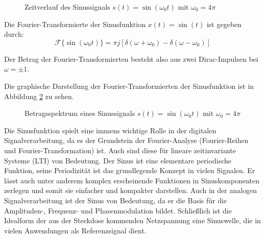 \begin{figure}[H]
\centering
{}
\caption{Zeitverlauf des Sinussignals $s(t) = \sin(\omega_0 t)$ mit $\omega_0 = 4\pi$}
\label{fig:sinus}
\end{figure}



Die Fourier-Transformierte der Sinusfunktion $x(t) = \sin(t)$ ist gegeben durch:
\[
\mathcal{F}\{\sin(\omega_0 t)\} = \pi j \left[ \delta(\omega + \omega_0) - \delta(\omega - \omega_0) \right]
\]

Der Betrag der Fourier-Transformierten besteht also aus zwei Dirac-Impulsen bei $\omega = \pm 1$.

Die graphische Darstellung der Fourier-Transformierten der Sinusfunktion ist in Abbildung \ref{fig:fourier_sinus_komplex} zu sehen.
\begin{figure}[H]
\centering
{}
\caption{Betragsspektrum eines Sinussignals $s(t) = \sin(\omega_0 t)$ mit $\omega_0 = 4\pi$}
\label{fig:fourier_sinus_komplex}
\end{figure}

Die Sinusfunktion spielt eine immens wichtige Rolle in der digitalen Signalverarbeitung, da es der Grundstein der Fourier-Analyse (Fourier-Reihen und Fourier-Transformation) ist. Auch sind diese für lineare zeitinvariante Systeme (LTI) von Bedeutung. 
Der Sinus ist eine elementare periodische Funktion, seine Periodizität ist das grundlegende Konzept in vielen Signalen. Er lässt auch unter anderem komplex erscheinende Funktionen in Sinuskomponenten zerlegen und somit sie einfacher und kompakter darstellen.
Auch in der analogen Signalverarbeitung ist der Sinus von Bedeutung, da er die Basis für die Amplituden-, Frequenz- und Phasenmodulation bildet. Schließlich ist die Idealform der aus der Steckdose kommenden Netzspannung eine Sinuswelle, die in vielen Anwendungen als Referenzsignal dient. 

